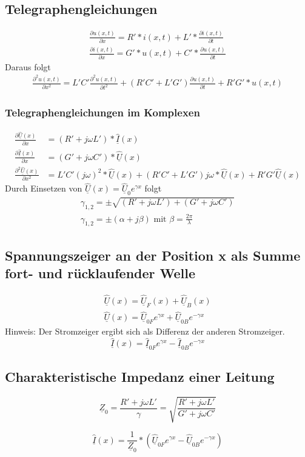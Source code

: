 \documentclass[11pt]{scrartcl}
\def\Uc{\underline{\hat U}}
\def\Ic{\underline{\hat I}}
\begin{document}
	\subsection{Telegraphengleichungen}
	\begin{eqnarray}
		\frac{\partial u(x,t)}{\partial x}=R'*i(x,t)+L'*\frac{\partial i(x,t)}{\partial t}\\
		\frac{\partial i(x,t)}{\partial x}=G'*u(x,t)+C'*\frac{\partial u(x,t)}{\partial t}
	\end{eqnarray}
	Daraus folgt
	\begin{eqnarray}
		\frac{\partial ^2u(x,t)}{\partial x^2}=L'C'\frac{\partial ^2u(x,t)}{\partial t^2}+(R'C'+L'G')\frac{\partial u(x,t)}{\partial t}+R'G'*u(x,t)
	\end{eqnarray}
	\subsubsection{Telegraphengleichungen im Komplexen}
	\begin{align}
		\frac{\partial \Uc(x)}{\partial x}&=(R'+j\omega L')*\Ic(x) \\
		\frac{\partial \Ic(x)}{\partial x}&=(G'+j\omega C')*\Uc(x) \\
		\frac{\partial ^2\Uc(x)}{\partial x^2}&=L'C'(j\omega)^2*\Uc(x)+(R'C'+L'G')j\omega*\Uc(x)+R'G'\Uc(x)	
	\end{align}
Durch Einsetzen von $\Uc(x)=\Uc_0e^{\gamma x}$ folgt
\begin{eqnarray}
	\gamma_{1,2}=\pm \sqrt{(R'+j\omega L')+(G'+j\omega C')} \\
	\gamma_{1,2}=\pm (\alpha+j\beta) \text{ mit } \beta=\frac{2\pi}{\lambda}
\end{eqnarray} 

\subsection{Spannungszeiger an der Position x als Summe fort- und rücklaufender Welle}
\begin{eqnarray}
	\Uc(x)=\Uc_F(x)+\Uc_B(x) \\
	\Uc(x)=\Uc_{0F} e^{\gamma x} + \Uc_{0B} e^{-\gamma x}
\end{eqnarray}
Hinweis: Der Stromzeiger ergibt sich als Differenz der anderen Stromzeiger.
\begin{equation}
	\Ic(x)=\Ic_{0F} e^{\gamma x} - \Ic_{0B} e^{-\gamma x}
\end{equation}
\subsection{Charakteristische Impedanz einer Leitung}
\begin{mdframed}[backgroundcolor = sand]
	\begin{equation}
		\underline{Z}_0 = \frac{R'+j\omega L'}{\gamma} = \sqrt{\frac{R'+j\omega L'}{G' + j \omega C'}}
	\end{equation}
\end{mdframed}
\begin{equation}
\Ic(x) = \frac{1}{\underline{Z}_0} * (\Uc_{0F}  e^{\gamma x} - \Uc_{0B}  e^{-\gamma x})
\end{equation}
	
\end{document}
